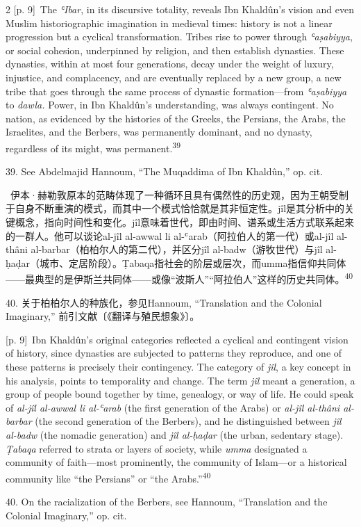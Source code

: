 \documentclass[10pt,a4paper]{article}
\begin{document}
\begin{paracol}{2}
\switchcolumn
{\scriptsize\color{gray} [p. 9]}\ The \textit{ʿIbar}, in its discursive totality, reveals Ibn Khaldûn’s vision and even Muslim historiographic imagination in medieval times: history is not a linear progression but a cyclical transformation. Tribes rise to power through \textit{ʿaṣabiyya}, or social cohesion, underpinned by religion, and then establish dynasties. These dynasties, within at most four generations, decay under the weight of luxury, injustice, and complacency, and are eventually replaced by a new group, a new tribe that goes through the same process of dynastic formation—from \textit{ʿaṣabiyya} to \textit{dawla.} Power, in Ibn Khaldûn’s understanding, was always contingent. No nation, as evidenced by the histories of the Greeks, the Persians, the Arabs, the Israelites, and the Berbers, was permanently dominant, and no dynasty, regardless of its might, was permanent.\nobreak\textsuperscript{39}\par{\small 39. See Abdelmajid Hannoum, “The Muqaddima of Ibn Khaldûn,” op. cit.\par}
\switchcolumn*
{\scriptsize\color{gray} [p. 9]}\ 伊本·赫勒敦原本的范畴体现了一种循环且具有偶然性的历史观，因为王朝受制于自身不断重演的模式，而其中一个模式恰恰就是其非恒定性。jîl是其分析中的关键概念，指向时间性和变化。jîl意味着世代，即由时间、谱系或生活方式联系起来的一群人。他可以谈论al-jîl al-awwal li al-ʿarab（阿拉伯人的第一代）或al-jîl al-thâni al-barbar（柏柏尔人的第二代），并区分jîl al-badw（游牧世代）与jîl al-ḥaḍar（城市、定居阶段）。Ṭabaqa指社会的阶层或层次，而umma指信仰共同体——最典型的是伊斯兰共同体——或像“波斯人”“阿拉伯人”这样的历史共同\mbox{体。\textsuperscript{40}}\par{\small 40. 关于柏柏尔人的种族化，参见Hannoum, “Translation and the Colonial Imaginary,” 前引文献〔《翻译与殖民想象》〕。\par}
\switchcolumn
{\scriptsize\color{gray} [p. 9]}\ Ibn Khaldûn’s original categories reflected a cyclical and contingent vision of history, since dynasties are subjected to patterns they reproduce, and one of these patterns is precisely their contingency. The category of \textit{jîl}, a key concept in his analysis, points to temporality and change. The term \textit{jîl} meant a generation, a group of people bound together by time, genealogy, or way of life. He could speak of \textit{al-jîl al-awwal li al-ʿarab} (the first generation of the Arabs) or \textit{al-jîl al-thâni al-barbar} (the second generation of the Berbers), and he distinguished between \textit{jîl al-badw} (the nomadic generation) and \textit{jîl al-ḥaḍar} (the urban, sedentary stage). \textit{Ṭabaqa} referred to strata or layers of society, while \textit{umma} designated a community of faith—most prominently, the community of Islam—or a historical community like “the Persians” or “the Arabs.”\nobreak\textsuperscript{40}\par{\small 40. On the racialization of the Berbers, see Hannoum, “Translation and the Colonial Imaginary,” op. cit.\par}

\end{paracol}
\end{document}
